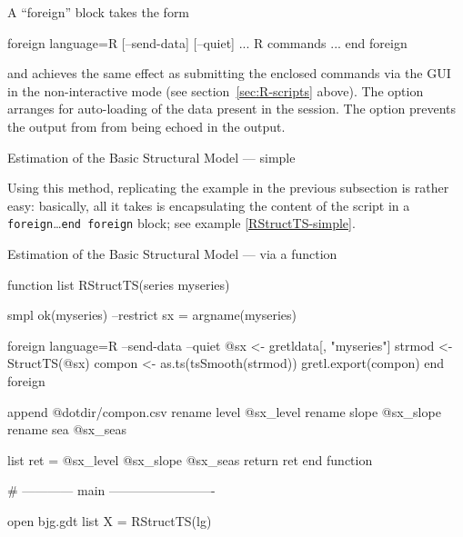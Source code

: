 A ``foreign'' block takes the form
\begin{code}
foreign language=R [--send-data] [--quiet]
    ... R commands ...
end foreign
\end{code}
and achieves the same effect as submitting the enclosed 
commands via the GUI in the non-interactive mode (see
section~\ref{sec:R-scripts} above). The  option
arranges for auto-loading of the data present in the 
session.  The  option prevents the output from 
from being echoed in the  output.

\begin{script}[htbp]
  \caption{Estimation of the Basic Structural Model --- simple}
\label{RStructTS-simple}
\end{script}

Using this method, replicating the example in the previous subsection
is rather easy: basically, all it takes is encapsulating the content
of the  script in a \texttt{foreign}\ldots\texttt{end foreign}
block; see example \ref{RStructTS-simple}.

\begin{script}[htbp]
  \caption{Estimation of the Basic Structural Model --- via a function}
\begin{scode}
function list RStructTS(series myseries)

    smpl ok(myseries) --restrict
    sx = argname(myseries)

    foreign language=R --send-data --quiet
        @sx <- gretldata[, "myseries"]
        strmod <- StructTS(@sx)
        compon <- as.ts(tsSmooth(strmod))
        gretl.export(compon)
    end foreign

    append @dotdir/compon.csv
    rename level @sx_level
    rename slope @sx_slope
    rename sea @sx_seas

    list ret = @sx_level @sx_slope @sx_seas
    return ret
end function

# ------------ main -------------------------

open bjg.gdt
list X = RStructTS(lg)
\end{scode}

\label{RStructTS-func}
\end{script}

